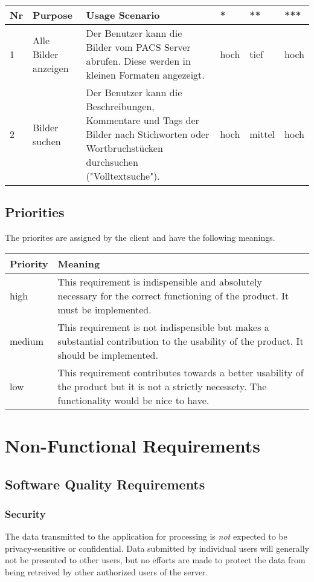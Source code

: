 \documentclass[a4paper]{srs}
\begin{document}
\begin{tabularx}{\textwidth}{
	>{\raggedright}p{0.5cm}
	>{\raggedright}p{2.4cm}
	>{\raggedright}X
	l
	l
	l
}
	  Nr
	& Purpose
	& Usage Scenario
	& *
	& **
	& ***
\\\toprule
	  1
	& Alle Bilder anzeigen
	& Der Benutzer kann die Bilder vom PACS Server abrufen.
	  Diese werden in kleinen Formaten angezeigt.
	& hoch & tief & hoch
\\\midrule
	  2
	& Bilder suchen
	& Der Benutzer kann die Beschreibungen, Kommentare und Tags der Bilder nach Stichworten
	  oder Wortbruchstücken durchsuchen ("Volltextsuche").
	& hoch & mittel & hoch
\\\bottomrule
\end{tabularx}

\subsection{Priorities}
The priorites are assigned by the client and have the following meanings.

\begin{tabularx}{\textwidth}{l|X}
	Priority & Meaning
\\\hline
	  high
	& This requirement is indispensible and absolutely necessary for the correct functioning of the product. It must be implemented.
\\\hline
	  medium
	& This requirement is not indispensible but makes a substantial contribution to the usability of the product. It should be implemented.
\\\hline
	  low
	& This requirement contributes towards a better usability of the product but it is not a strictly necessety. The functionality would be nice to have.
\end{tabularx}

	\section{Non-Functional Requirements}

\subsection{Software Quality Requirements}
\subsubsection{Security}
The data transmitted to the application for processing is \emph{not} expected to be privacy-sensitive or confidential. Data submitted by individual users will generally not be presented to other users, but no efforts are made to protect the data from being retreived by other authorized users of the server.
\end{document}
